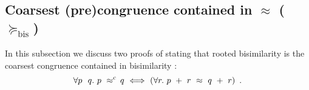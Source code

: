 
\subsection{Coarsest (pre)congruence contained in $\approx$ ($\succeq_{\mathrm{bis}}$)}
\label{s:coarsest}


In this subsection we discuss two proofs of  stating that
rooted bisimilarity is the coarsest congruence contained in
bisimilarity \cite{van2005characterisation,Gorrieri:2015jt,Mil89}:
\begin{equation}
\label{eq:coarsest}
\forall p\ \ q.\ p\ \rapprox\ \! q\ \Longleftrightarrow\ ( \forall r.\ p\ +\
r\ \approx\ q\ +\ r )\enspace.
\end{equation}


